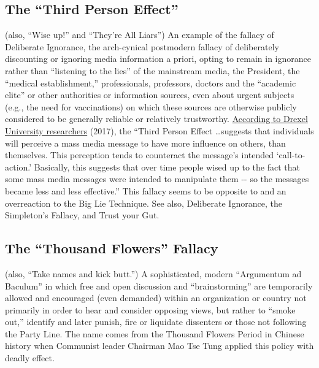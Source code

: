 \documentclass[10pt,a4paper,british]{article}
\begin{document}
\begin{multicols}{2}
    \subsection{The ``Third Person Effect'' } (also, ``Wise up!'' and ``They're All Liars'')  An example of the fallacy of Deliberate Ignorance, the arch{-}cynical postmodern fallacy of deliberately discounting or ignoring media information a priori, opting to remain in ignorance rather than ``listening to the lies'' of the mainstream media, the President, the ``medical establishment,'' professionals, professors, doctors and the ``academic elite'' or other authorities or information sources, even about urgent subjects (e.g., the need for vaccinations) on which these sources are otherwise publicly considered to be generally reliable or relatively trustworthy.  \href{https://www.eurekalert.org/pub_releases/2017-02/du-na020817.php}{According to Drexel University researchers} (2017), the ``Third Person Effect \ldots  suggests that individuals will perceive a mass media message to have more influence on others, than themselves. This perception tends to counteract the message's intended `call{-}to{-}action.' Basically, this suggests that over time people wised up to the fact that some mass media messages were intended to manipulate them {-}{-} so the messages became less and less effective.'' This fallacy seems to be opposite to and an overreaction to the Big Lie Technique. See also, Deliberate Ignorance, the Simpleton's Fallacy, and Trust your Gut.  

    \subsection{The ``Thousand Flowers'' Fallacy} (also, ``Take names and kick butt.'') A sophisticated, modern ``Argumentum ad Baculum'' in which free and open discussion and ``brainstorming'' are temporarily allowed and encouraged (even demanded) within an organization or country not primarily in order to hear and consider opposing views, but rather to ``smoke out,'' identify and later punish, fire or liquidate dissenters or those not following the Party Line. The name comes from the Thousand Flowers Period in Chinese history when Communist leader Chairman Mao Tse Tung applied this policy with deadly effect.  


\end{multicols}
\end{document}
